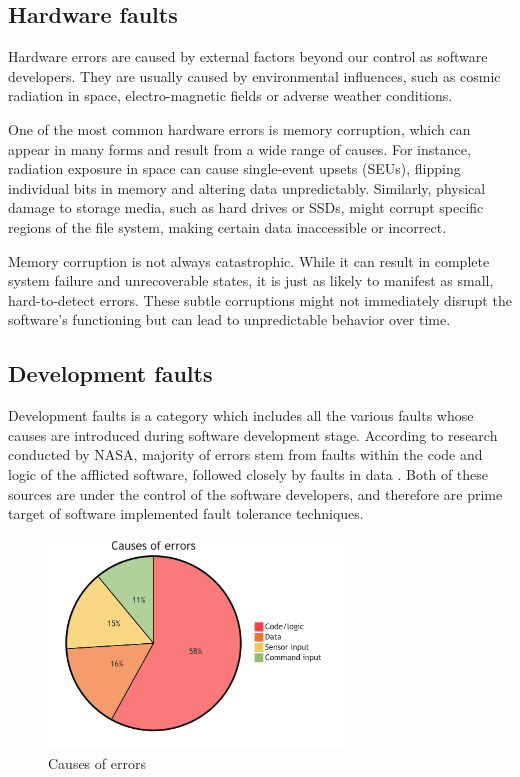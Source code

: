 \subsection{Hardware faults}

Hardware errors are caused by external factors beyond our control as software developers. They are usually caused by environmental influences, such as cosmic radiation in space, electro-magnetic fields or adverse weather conditions.

One of the most common hardware errors is memory corruption, which can appear in many forms and result from a wide range of causes. For instance, radiation exposure in space can cause single-event upsets (SEUs), flipping individual bits in memory and altering data unpredictably. Similarly, physical damage to storage media, such as hard drives or SSDs, might corrupt specific regions of the file system, making certain data inaccessible or incorrect.

Memory corruption is not always catastrophic. While it can result in complete system failure and unrecoverable states, it is just as likely to manifest as small, hard-to-detect errors. These subtle corruptions might not immediately disrupt the software's functioning but can lead to unpredictable behavior over time.

\subsection{Development faults}

Development faults is a category which includes all the various faults whose causes are introduced during software development stage. According to research conducted by NASA, majority of errors stem from faults within the code and logic of the afflicted software, followed closely by faults in data \cite{nasa:stats}. Both of these sources are under the control of the software developers, and therefore are prime target of software implemented fault tolerance techniques.

\begin{figure}[!hbt]
    \centering
    \includegraphics[width=0.7\textwidth]{diagrams/stats/piechart.png}
    \caption{Causes of errors \cite{nasa:stats}}
\end{figure}

